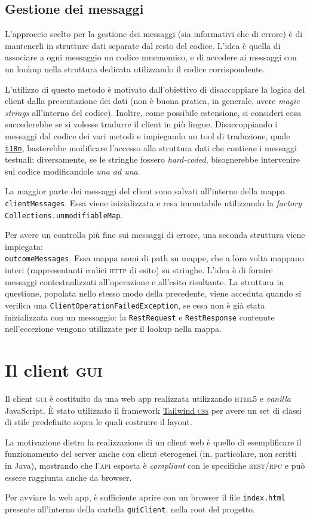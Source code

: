 \documentclass[a4paper,8pt]{article} %
\def\code#1{\texttt{#1}}
\begin{document}
\subsection{Gestione dei messaggi}
\label{sec:err_handling}
L'approccio scelto per la gestione dei messaggi (sia informativi che di errore) è di mantenerli in strutture dati separate dal resto del codice.
L'idea è quella di associare a ogni messaggio un codice mnemomico, e di accedere ai messaggi con un lookup nella struttura dedicata utilizzando il codice corrispondente.
\par L'utilizzo di questo metodo è motivato dall'obiettivo di disaccoppiare la logica del client dalla presentazione dei dati (non è buona pratica, in generale, avere \emph{magic strings} all'interno del codice). Inoltre,
come possibile estensione, si consideri cosa succederebbe se si volesse tradurre il client in più lingue. Disaccoppiando i messaggi dal codice dei vari metodi e impiegando un tool di traduzione, quale \href{https://docs.oracle.com/javase/8/docs/technotes/guides/intl/index.html}{\code{i18n}},
basterebbe modificare l'accesso alla struttura dati che contiene i messaggi testuali; diversamente, se le stringhe fossero \emph{hard-coded}, bisognerebbe intervenire sul codice modificandole \emph{una ad una}.
\par La maggior parte dei messaggi del client sono salvati all'interno della mappa \code{clientMessages}. Essa viene inizializzata e resa immutabile utilizzando la \emph{factory} \code{Collections.unmodifiableMap}.
\par Per avere un controllo più fine sui messaggi di errore, una seconda struttura viene impiegata: \\ \code{outcomeMessages}. Essa mappa nomi di path su mappe, che a loro volta mappano interi
(rappresentanti codici \textsc{http} di esito) su stringhe. L'idea è di fornire messaggi contestualizzati all'operazione e all'esito risultante.
La struttura in questione, popolata nello stesso modo della precedente, viene acceduta quando si verifica una \code{ClientOperationFailedException}, se essa non è già stata inizializzata con un messaggio: la \code{RestRequest} e \code{RestResponse} contenute nell'eccezione vengono utilizzate per il lookup nella mappa.

\section{Il client \textsc{gui}}
Il client \textsc{gui} è costituito da una web app realizzata utilizzando \textsc{html5} e \emph{vanilla} JavaScript.
È stato utilizzato il framework \href{https://tailwindcss.com/}{Tailwind \textsc{css}} per avere un set di classi di stile predefinite sopra le quali costruire il layout.
\par La motivazione dietro la realizzazione di un client web è quello di esemplificare il funzionamento del server anche con client eterogenei (in, particolare, non scritti in Java), mostrando
che l'\textsc{api} esposta è \emph{compliant} con le specifiche \textsc{rest}/\textsc{rpc} e può essere raggiunta anche da browser.
\par Per avviare la web app, è sufficiente aprire con un browser il file \code{index.html} presente all'interno della cartella \code{guiClient}, nella root del progetto.
\end{document}
